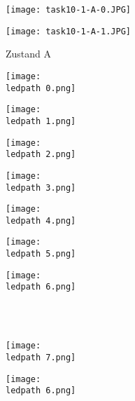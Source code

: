 \begin{figure}
	\begin{minipage}[c]{0.48\linewidth}
		\texttt{[image: task10-1-A-0.JPG]}
	\end{minipage}
	\hfill
	\begin{minipage}[c]{0.485\linewidth}
		\texttt{[image: task10-1-A-1.JPG]}
	\end{minipage}
	\caption{Zustand A}
	\label{task10-1-A}
\end{figure}

\def\ledspacing{0.13\linewidth}
\def\ledpath{/KnightRider_erleuchtete-LEDs/LED-}

\begin{figure}
	\begin{minipage}[c]{\ledspacing}
		\texttt{[image: \\ledpath 0.png]}
	\end{minipage}
	\hfill
	\begin{minipage}[c]{\ledspacing}
		\texttt{[image: \\ledpath 1.png]}
	\end{minipage}
	\hfill
	\begin{minipage}[c]{\ledspacing}
		\texttt{[image: \\ledpath 2.png]}
	\end{minipage}
	\hfill
	\begin{minipage}[c]{\ledspacing}
		\texttt{[image: \\ledpath 3.png]}
	\end{minipage}
	\hfill
	\begin{minipage}[c]{\ledspacing}
		\texttt{[image: \\ledpath 4.png]}
	\end{minipage}
	\hfill
	\begin{minipage}[c]{\ledspacing}
		\texttt{[image: \\ledpath 5.png]}
	\end{minipage}
	\hfill
	\begin{minipage}[c]{\ledspacing}
		\texttt{[image: \\ledpath 6.png]}
	\end{minipage}
	\\ \\
	\begin{minipage}[c]{\ledspacing}
	\texttt{[image: \\ledpath 7.png]}
	\end{minipage}
	\hfill
	\begin{minipage}[c]{\ledspacing}
	\texttt{[image: \\ledpath 6.png]}
	\end{minipage}
	\hfill
	\begin{minipage}[c]{\ledspacing}

\end{minipage}
\end{figure}
